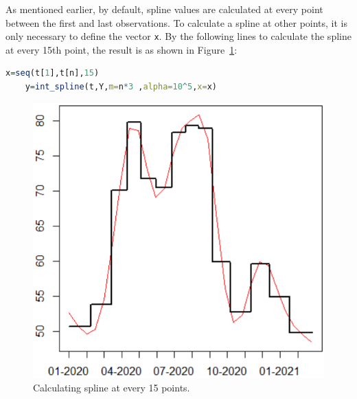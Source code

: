 \documentclass[a4paper,10pt]{article}
\begin{document}
As mentioned earlier, by default, spline values are calculated at every point between the first and last observations.
To calculate a spline at other points, it is only necessary to define the vector \lstinline|x|.
By the following lines to calculate the spline at every 15th point, the result is as shown in Figure~\ref{fig:every_15th}: 
\begin{lstlisting}[language=R]
	x=seq(t[1],t[n],15)
	y=int_spline(t,Y,m=n*3 ,alpha=10^5,x=x)	
\end{lstlisting}
\begin{figure}[h]
	\centering
	\includegraphics[width=0.49\linewidth]{every_15th.png}
	\caption{\label{fig:every_15th}  Calculating spline at every 15 points.}
\end{figure}
\end{document}
